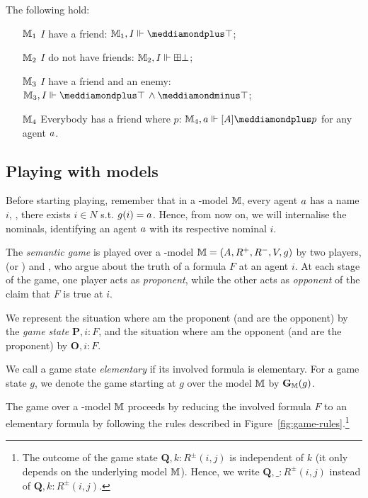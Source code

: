 \begin{example}
\begin{center}
\begin{tikzpicture}[x=0.75pt,y=0.75pt,yscale=-1,xscale=1]
\end{tikzpicture}

\end{center}
The following hold:
\begin{itemize}
\item[$\M_1$] $I$ have a friend: $\M_1, I \Vdash \dplus\top$;
\item[$\M_2$] $I$ do not have friends: $\M_2, I \Vdash \bplus\bot$;
\item[$\M_3$] $I$ have a friend and an enemy: $\M_3, I \Vdash \dplus \top\,\wedge \dminus\top$;
\item[$\M_4$] Everybody has a friend where $p$: $\M_4, \ag \Vdash  [A ]  \dplus p$ for any agent $\ag$.
\end{itemize} 
 \end{example}


\subsection{Playing with models}\label{sec:game-semantics}
Before starting playing, remember that in a \PNL-model $\M$, every agent $\ag$ has a name $i$, \ie, there exists $i\in N$ s.t. $\g(i)=\ag$. Hence, from now on, we will internalise the nominals, identifying an agent $\ag$ with its respective nominal $i$.

The  \emph{semantic game} is played over a \PNL-model $\M=(\A,\R^+,\R^-,\V,\g)$ by two
players, \Me (or \Ic) and \You, who argue about the truth of a formula $ F $ at an
agent $i$. At each stage of the game, one player acts as \emph{proponent}, while the
other acts as \emph{opponent} of the claim that  $ F $ is true at 
$i$. 

We represent the situation where \Ic am the proponent (and \You are the
opponent) by the \emph{game state} $\mathbf{P}, i: F $, and the situation
where \Ic am the opponent (and \You are the proponent) by $\mathbf{O},
i: F $. 

We call a game state \emph{elementary} if its involved formula is elementary. For a game state $g$, we denote the game starting at $g$ over the model $\M$ by $\mathbf{G}_\M(g)$.

The game over a \PNL-model $\M$ proceeds by reducing the involved formula $ F $ to an elementary formula by following the rules described in Figure~\ref{fig:game-rules}.\footnote{The outcome of the game state $\mathbf{Q},k:R^{\pm}(i,j)$ is independent of $k$ (it only depends on the underlying model $\M$). Hence, we write 
        $\mathbf{Q},\_:R^\pm(i,j)$ instead of $\mathbf{Q},k:R^\pm(i,j)$.\label{foot:R}}


